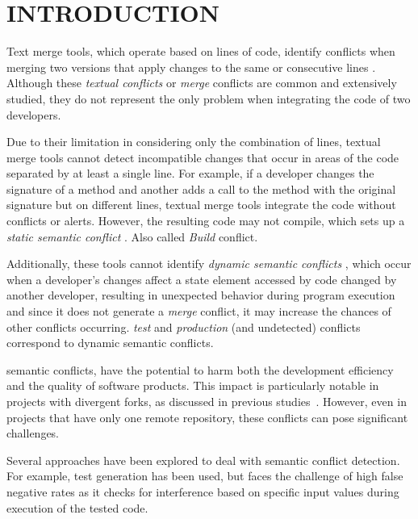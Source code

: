 \documentclass[sigconf,review]{acmart}
\begin{document}
\section{INTRODUCTION}

Text merge tools, which operate based on lines of code, identify conflicts when merging two versions that apply changes to the same or consecutive lines \cite{accioly2018understanding}. Although these \emph{textual conflicts} or \emph{merge} conflicts are common and extensively studied, they do not represent the only problem when integrating the code of two developers.

Due to their limitation in considering only the combination of lines, textual merge tools cannot detect incompatible changes that occur in areas of the code separated by at least a single line. For example, if a developer changes the signature of a method and another adds a call to the method with the original signature but on different lines, textual merge tools integrate the code without conflicts or alerts. However, the resulting code may not compile, which sets up a \emph{static semantic conflict} \cite{sarma2011palantir, brun2013early, towqir2022detecting, silva2022detecting, zhang2022using,sung2020towards}. Also called \emph{Build} conflict.

Additionally, these tools cannot identify \emph{dynamic semantic conflicts} \cite{Horwitz1989IntegratingNV, yang1992program, shao2009sca, brun2013early, pastore2017bdci, barros2017using, sousa2018verified, da2020detecting, zhang2022using}, which occur when a developer's changes affect a state element accessed by code changed by another developer, resulting in unexpected behavior during program execution and since it does not generate a \textit{merge} conflict, it may increase the chances of other \cite{lima2014abordagem} conflicts occurring. \emph{test} and \emph{production} (and undetected) conflicts correspond to dynamic semantic conflicts.

semantic conflicts, have the potential to harm both the development efficiency and the quality of software products. This impact is particularly notable in projects with divergent forks, as discussed in previous studies~\cite{sung2020towards, zhang2022using, mens2002state, zimmermann2007mining, bird2012assessing, brun2013early}. However, even in projects that have only one remote repository, these conflicts can pose significant challenges.

Several approaches have been explored to deal with semantic conflict detection. For example, \cite{silva2022detecting} test generation has been used, but faces the challenge of high false negative rates as it checks for interference based on specific input values during execution of the tested code.
\end{document}
